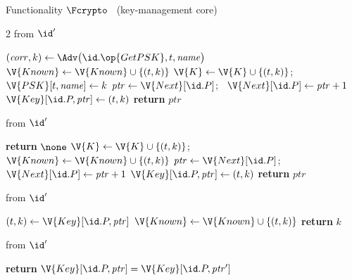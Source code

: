 \begin{interface}[nofloat]{Functionality $\Fcrypto$ \ (key-management core) \\
}
{\begin{multicols}{2}
 \quad from $\id'$
\begin{algorithmic}[1]
\algcont
{}
\State $(\mathit{corr}, k) \gets \Adv\bigl(\id.\op{GetPSK}, t, \mathit{name}\bigr)$
   \label{ln:crypskagree}
\EndIf
{}
   \label{ln:crypskfresh}
\EndIf
{}
   \label{ln:crypskcorrupt}
  \State $\V{Known} \gets \V{Known} \cup \{(t,k)\}$
\EndIf
\State $\V{K} \gets \V{K} \cup \{(t,k)\}$; \ $\V{PSK}[t, \mathit{name}] \gets k$
\State $\mathit{ptr} \gets \V{Next}[\id.P]$; \ $\V{Next}[\id.P] \gets \mathit{ptr} + 1$
\State $\V{Key}[\id.P, \mathit{ptr}] \gets (t,k)$
\State \textbf{return} $\mathit{ptr}$
\algsave
\end{algorithmic}
\vspace{1.4ex}

\columnbreak

 \quad from $\id'$
\begin{algorithmic}[1]
\algcont
{}
  \State \textbf{return} $\none$ \label{ln:cryguess}
\EndIf
\State $\V{K} \gets \V{K} \cup \{(t,k)\}$; \ $\V{Known} \gets \V{Known} \cup \{(t,k)\}$ \label{ln:crystoreknown}
\State $\mathit{ptr} \gets \V{Next}[\id.P]$; \ $\V{Next}[\id.P] \gets \mathit{ptr} + 1$
\State $\V{Key}[\id.P, \mathit{ptr}] \gets (t,k)$
\State \textbf{return} $\mathit{ptr}$
\algsave
\end{algorithmic}
\vspace{1.4ex}

 \quad from $\id'$
\begin{algorithmic}[1]
\algcont
{}
\State $(t,k) \gets \V{Key}[\id.P, \mathit{ptr}]$
\State $\V{Known} \gets \V{Known} \cup \{(t,k)\}$ \label{ln:cryretrieve}
\State \textbf{return} $k$
\algsave
\end{algorithmic}
\vspace{1.4ex}

 \quad from $\id'$
\begin{algorithmic}[1]
\algcont
{}
\State \textbf{return} $\V{Key}[\id.P, \mathit{ptr}] = \V{Key}[\id.P, \mathit{ptr}']$ \label{ln:cryequal}
\algsave
\end{algorithmic}
\vspace{1.4ex}


\end{multicols}}
\end{interface}
